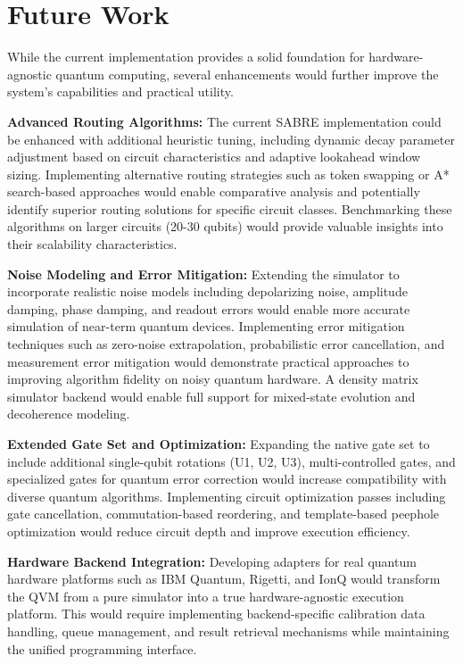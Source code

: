 \section{Future Work}

While the current implementation provides a solid foundation for hardware-agnostic quantum computing, several enhancements would further improve the system's capabilities and practical utility.

\textbf{Advanced Routing Algorithms:} The current SABRE implementation could be enhanced with additional heuristic tuning, including dynamic decay parameter adjustment based on circuit characteristics and adaptive lookahead window sizing. Implementing alternative routing strategies such as token swapping or A* search-based approaches would enable comparative analysis and potentially identify superior routing solutions for specific circuit classes. Benchmarking these algorithms on larger circuits (20-30 qubits) would provide valuable insights into their scalability characteristics.

\textbf{Noise Modeling and Error Mitigation:} Extending the simulator to incorporate realistic noise models including depolarizing noise, amplitude damping, phase damping, and readout errors would enable more accurate simulation of near-term quantum devices. Implementing error mitigation techniques such as zero-noise extrapolation, probabilistic error cancellation, and measurement error mitigation would demonstrate practical approaches to improving algorithm fidelity on noisy quantum hardware. A density matrix simulator backend would enable full support for mixed-state evolution and decoherence modeling.

\textbf{Extended Gate Set and Optimization:} Expanding the native gate set to include additional single-qubit rotations (U1, U2, U3), multi-controlled gates, and specialized gates for quantum error correction would increase compatibility with diverse quantum algorithms. Implementing circuit optimization passes including gate cancellation, commutation-based reordering, and template-based peephole optimization would reduce circuit depth and improve execution efficiency.

\textbf{Hardware Backend Integration:} Developing adapters for real quantum hardware platforms such as IBM Quantum, Rigetti, and IonQ would transform the QVM from a pure simulator into a true hardware-agnostic execution platform. This would require implementing backend-specific calibration data handling, queue management, and result retrieval mechanisms while maintaining the unified programming interface.


